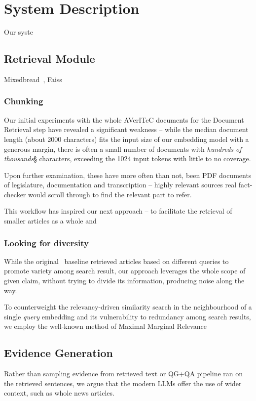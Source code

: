 
\section{System Description}
\label{sec:system}
Our syste

\subsection{Retrieval Module}
Mixedbread~\cite{li-li-2024-aoe,emb2024mxbai}, Faiss~\cite{douze2024faiss,johnson2019billion}

\subsubsection{Chunking}
Our initial experiments with the whole AVerITeC documents for the Document Retrieval step have revealed a significant weakness -- while the median document length (about 2000 characters) fits the input size of our embedding model with a generous margin, there is often a small number of documents with \textit{hundreds of thousands}§ characters, exceeding the 1024 input tokens with little to no coverage.

Upon further examination, these have more often than not, been PDF documents of legislature, documentation and transcription -- highly relevant sources real fact-checker would scroll through to find the relevant part to refer. 

This workflow has inspired our next approach -- to facilitate the retrieval of smaller articles as a whole and 

\subsubsection{Looking for diversity}
While the original~\cite{averitec2024} baseline retrieved articles based on different queries to promote variety among search result, our approach leverages the whole scope of given claim, without trying to divide its information, producing noise along the way.

To counterweight the relevancy-driven similarity search in the neighbourhood of a single \textit{query} embedding and its vulnerability to redundancy among search results, we employ the well-known method of Maximal Marginal Relevance~\cite{}


\subsection{Evidence Generation}
Rather than sampling evidence from retrieved text or QG+QA pipeline ran on the retrieved sentences, we argue that the modern LLMs offer the use of wider context, such as whole news articles.



